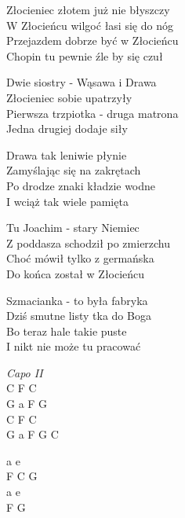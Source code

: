 \begin{text}
    \ifchorded{\hfill\break}
    \vin Złocieniec złotem już nie błyszczy\\
    \vin W Złocieńcu wilgoć łasi się do nóg\\
    \vin Przejazdem dobrze być w Złocieńcu\\
    \vin Chopin tu pewnie źle by się czuł

    Dwie siostry - Wąsawa i Drawa\\
    Złocieniec sobie upatrzyły\\
    Pierwsza trzpiotka - druga matrona\\
    Jedna drugiej dodaje siły

    Drawa tak leniwie płynie\\
    Zamyślając się na zakrętach\\
    Po drodze znaki kładzie wodne\\
    I wciąż tak wiele pamięta

    Tu Joachim - stary Niemiec\\
    Z poddasza schodził po zmierzchu\\
    Choć mówił tylko z germańska\\
    Do końca został w Złocieńcu

    Szmacianka - to była fabryka\\
    Dziś smutne listy tka do Boga\\
    Bo teraz hale takie puste\\
    I nikt nie może tu pracować
\end{text}
\begin{chord}
    \textit{Capo II}\\
    C F C\\
    G a F G\\
    C F C\\
    G a F G C

    a e\\
    F C G\\
    a e\\
    F G
\end{chord}